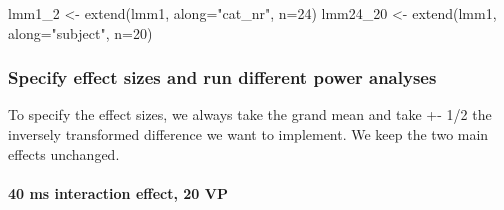 \documentclass[
]{article}
\newenvironment{Shaded}{\begin{snugshade}}{\end{snugshade}}
\newcommand{\AttributeTok}[1]{\textcolor[rgb]{0.77,0.63,0.00}{#1}}
\newcommand{\DecValTok}[1]{\textcolor[rgb]{0.00,0.00,0.81}{#1}}
\newcommand{\FunctionTok}[1]{\textcolor[rgb]{0.00,0.00,0.00}{#1}}
\newcommand{\NormalTok}[1]{#1}
\newcommand{\OtherTok}[1]{\textcolor[rgb]{0.56,0.35,0.01}{#1}}
\newcommand{\SpecialCharTok}[1]{\textcolor[rgb]{0.00,0.00,0.00}{#1}}
\newcommand{\StringTok}[1]{\textcolor[rgb]{0.31,0.60,0.02}{#1}}
\begin{document}
\begin{Shaded}
\begin{Highlighting}[]
\NormalTok{lmm1\_2 }\OtherTok{\textless{}{-}} \FunctionTok{extend}\NormalTok{(lmm1, }\AttributeTok{along=}\StringTok{"cat\_nr"}\NormalTok{, }\AttributeTok{n=}\DecValTok{24}\NormalTok{)}
\NormalTok{lmm24\_20 }\OtherTok{\textless{}{-}} \FunctionTok{extend}\NormalTok{(lmm1, }\AttributeTok{along=}\StringTok{"subject"}\NormalTok{, }\AttributeTok{n=}\DecValTok{20}\NormalTok{)}
\end{Highlighting}
\end{Shaded}

\hypertarget{specify-effect-sizes-and-run-different-power-analyses}{%
\subsubsection{Specify effect sizes and run different power
analyses}\label{specify-effect-sizes-and-run-different-power-analyses}}

To specify the effect sizes, we always take the grand mean and take +-
1/2 the inversely transformed difference we want to implement. We keep
the two main effects unchanged.

\hypertarget{ms-interaction-effect-20-vp}{%
\paragraph{40 ms interaction effect, 20
VP}\label{ms-interaction-effect-20-vp}}

\begin{Shaded}
\end{Shaded}
\end{document}
